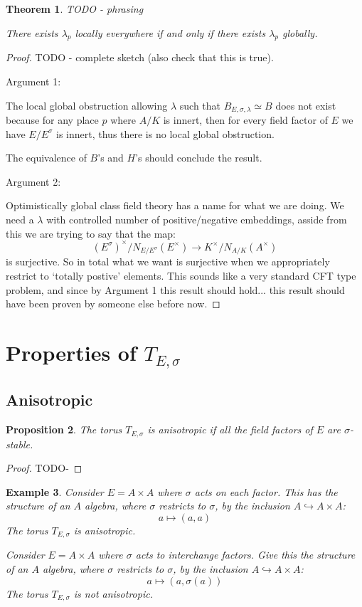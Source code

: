 \documentclass{article}
\theoremstyle{plain}
\newtheorem{theorem}{Theorem}[section]
\newtheorem{proposition}[theorem]{Proposition}
\newtheorem{example}[theorem]{Example}
\theoremstyle{definition}
\begin{document}
\begin{theorem}
TODO - phrasing

There exists $\lambda_p$ locally everywhere if and only if there exists $\lambda_p$ globally.
\end{theorem}
\begin{proof}
TODO - complete sketch (also check that this is true).

Argument 1:

The local global obstruction allowing $\lambda$ such that $B_{E,\sigma,\lambda} \simeq B$ does not exist because for any place $p$ where $A/K$ is innert, then for every field factor of $E$ we have $E/E^\sigma$ is innert, thus there is no local global obstruction.

The equivalence of $B$'s and $H$'s should conclude the result.

\bigskip
Argument 2:

Optimistically global class field theory has a name for what we are doing.
We need a $\lambda$ with controlled number of positive/negative embeddings, asside from this we are trying to say that the map:
\[ (E^\sigma)^\times/N_{E/E^\sigma}(E^\times) \rightarrow K^\times/N_{A/K}(A^\times) \]
is surjective.
So in total what we want is surjective when we appropriately restrict to `totally postive' elements. This sounds like a very standard CFT type problem, and since by Argument 1 this result should hold... this result should have been proven by someone else before now.
\end{proof}


\section{Properties of $T_{E,\sigma}$}

\subsection{Anisotropic}

\begin{proposition}
The torus $T_{E,\sigma}$ is anisotropic if all the field factors of $E$ are $\sigma$-stable.
\end{proposition}
\begin{proof}
TODO-
\end{proof}

\begin{example}
Consider $E = A \times A$ where $\sigma$ acts on each factor.
This has the structure of an $A$ algebra, where $\sigma$ restricts to $\sigma$, by the inclusion $A\hookrightarrow A\times A$:
\[ a \mapsto (a,a) \]
The torus $T_{E,\sigma}$ is anisotropic.

\bigskip
Consider $E = A \times A$ where $\sigma$ acts to interchange factors.
Give this the structure of an $A$ algebra, where $\sigma$ restricts to $\sigma$, by the inclusion $A\hookrightarrow A\times A$:
\[ a \mapsto (a,\sigma(a)) \]
The torus $T_{E,\sigma}$ is not anisotropic.
\end{example}
\end{document}
